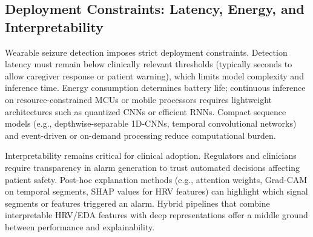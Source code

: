 \subsection{Deployment Constraints: Latency, Energy, and Interpretability}
Wearable seizure detection imposes strict deployment constraints.
Detection latency must remain below clinically relevant thresholds 
(typically seconds to allow caregiver response or patient warning), 
which limits model complexity and inference time.
Energy consumption determines battery life; 
continuous inference on resource-constrained MCUs or mobile processors 
requires lightweight architectures such as quantized CNNs or efficient RNNs.
Compact sequence models (e.g., depthwise-separable 1D-CNNs, temporal convolutional networks) 
and event-driven or on-demand processing reduce computational burden.

Interpretability remains critical for clinical adoption. 
Regulators and clinicians require transparency in alarm generation 
to trust automated decisions affecting patient safety.
Post-hoc explanation methods (e.g., attention weights, Grad-CAM on temporal segments, 
SHAP values for HRV features) can highlight which signal segments or features triggered an alarm.
Hybrid pipelines that combine interpretable HRV/EDA features with deep representations 
offer a middle ground between performance and explainability.
